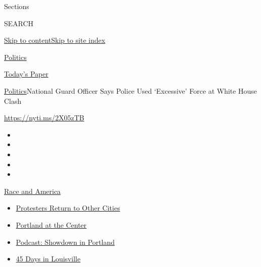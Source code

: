 Sections

SEARCH

\protect\hyperlink{site-content}{Skip to
content}\protect\hyperlink{site-index}{Skip to site index}

\href{https://www.nytimes.com/section/politics}{Politics}

\href{https://myaccount.nytimes.com/auth/login?response_type=cookie\&client_id=vi}{}

\href{https://www.nytimes.com/section/todayspaper}{Today's Paper}

\href{/section/politics}{Politics}\textbar{}National Guard Officer Says
Police Used `Excessive' Force at White House Clash

\url{https://nyti.ms/2X05zTB}

\begin{itemize}
\item
\item
\item
\item
\item
\end{itemize}

\href{https://www.nytimes.com/news-event/george-floyd-protests-minneapolis-new-york-los-angeles?action=click\&pgtype=Article\&state=default\&region=TOP_BANNER\&context=storylines_menu}{Race
and America}

\begin{itemize}
\tightlist
\item
  \href{https://www.nytimes.com/2020/07/26/us/protests-portland-seattle-trump.html?action=click\&pgtype=Article\&state=default\&region=TOP_BANNER\&context=storylines_menu}{Protesters
  Return to Other Cities}
\item
  \href{https://www.nytimes.com/2020/07/24/us/portland-oregon-protests-white-race.html?action=click\&pgtype=Article\&state=default\&region=TOP_BANNER\&context=storylines_menu}{Portland
  at the Center}
\item
  \href{https://www.nytimes.com/2020/07/23/podcasts/the-daily/portland-protests.html?action=click\&pgtype=Article\&state=default\&region=TOP_BANNER\&context=storylines_menu}{Podcast:
  Showdown in Portland}
\item
  \href{https://www.nytimes.com/interactive/2020/07/16/us/black-lives-matter-protests-louisville-breonna-taylor.html?action=click\&pgtype=Article\&state=default\&region=TOP_BANNER\&context=storylines_menu}{45
  Days in Louisville}
\end{itemize}


